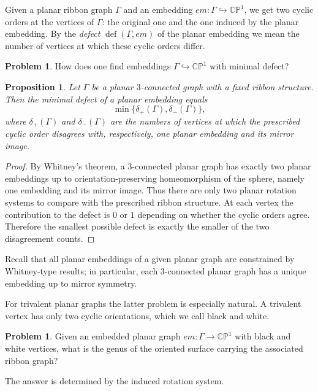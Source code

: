 \documentclass[reqno]{amsart}
\newtheorem{proposition}[theorem]{Proposition}
\theoremstyle{definition}
\newtheorem{problem}[theorem]{Problem}
\newcommand {\Ga}{\Gamma}
\newcommand {\bCP} {\mathbb {CP}}
\begin{document}
Given a planar ribbon graph $\Ga$ and an embedding $em:\Ga\hookrightarrow \bCP^1$, we get two cyclic orders at the vertices of $\Ga$: the original one and the one induced by the planar embedding. By the \emph{defect} $\operatorname{def}(\Ga,em)$ of the planar embedding we mean the number of vertices at which these cyclic orders differ.

\begin{problem}
How does one find embeddings $\Ga\hookrightarrow \bCP^1$ with minimal defect?
\end{problem}

\begin{proposition}\label{pr:defect3conn}
Let $\Ga$ be a planar $3$-connected graph with a fixed ribbon structure. Then the minimal defect of a planar embedding equals
\[
\min\{\delta_+(\Ga),\delta_-(\Ga)\},
\]
where $\delta_+(\Ga)$ and $\delta_-(\Ga)$ are the numbers of vertices at which the prescribed cyclic order disagrees with, respectively, one planar embedding and its mirror image.
\end{proposition}

\begin{proof}
By Whitney's theorem, a $3$-connected planar graph has exactly two planar embeddings up to orientation-preserving homeomorphism of the sphere, namely one embedding and its mirror image. Thus there are only two planar rotation systems to compare with the prescribed ribbon structure. At each vertex the contribution to the defect is $0$ or $1$ depending on whether the cyclic orders agree. Therefore the smallest possible defect is exactly the smaller of the two disagreement counts.
\end{proof}

Recall that all planar embeddings of a given planar graph are constrained by Whitney-type results; in particular, each 3-connected planar graph has a unique embedding up to mirror symmetry.

For trivalent planar graphs the latter problem is especially natural. A trivalent vertex has only two cyclic orientations, which we call black and white.

\begin{problem}\label{pr:genusbw}
Given an embedded planar graph $em:\Ga\to \bCP^1$ with black and white vertices, what is the genus of the oriented surface carrying the associated ribbon graph?
\end{problem}

The answer is determined by the induced rotation system.
\end{document}
